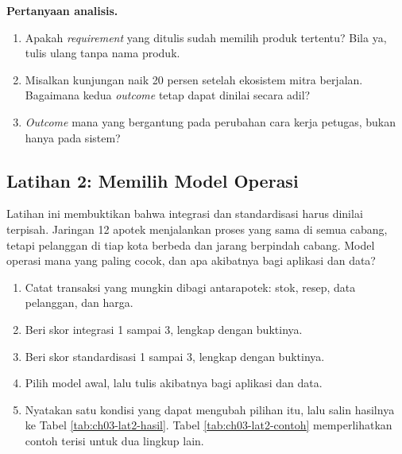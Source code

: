 \textbf{Pertanyaan analisis.}

\begin{enumerate}
  \item Apakah \textit{requirement} yang ditulis sudah memilih produk tertentu? Bila ya, tulis
        ulang tanpa nama produk.
  \item Misalkan kunjungan naik 20 persen setelah ekosistem mitra berjalan. Bagaimana kedua
        \textit{outcome} tetap dapat dinilai secara adil?
  \item \textit{Outcome} mana yang bergantung pada perubahan cara kerja petugas, bukan hanya
        pada sistem?
\end{enumerate}

\subsection*{Latihan 2: Memilih Model Operasi}

Latihan ini membuktikan bahwa integrasi dan standardisasi harus dinilai terpisah. Jaringan 12
apotek menjalankan proses yang sama di semua cabang, tetapi pelanggan di tiap kota berbeda dan
jarang berpindah cabang. Model operasi mana yang paling cocok, dan apa akibatnya bagi aplikasi
dan data?

\begin{enumerate}
  \item Catat transaksi yang mungkin dibagi antarapotek: stok, resep, data pelanggan, dan harga.
  \item Beri skor integrasi 1 sampai 3, lengkap dengan buktinya.
  \item Beri skor standardisasi 1 sampai 3, lengkap dengan buktinya.
  \item Pilih model awal, lalu tulis akibatnya bagi aplikasi dan data.
  \item Nyatakan satu kondisi yang dapat mengubah pilihan itu, lalu salin hasilnya ke Tabel
        \ref{tab:ch03-lat2-hasil}. Tabel \ref{tab:ch03-lat2-contoh} memperlihatkan contoh
        terisi untuk dua lingkup lain.
\end{enumerate}

